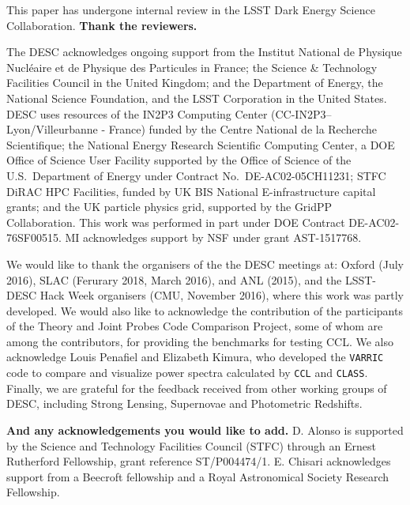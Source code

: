 %
This paper has undergone internal review in the LSST Dark Energy Science Collaboration. {\bf Thank the reviewers.}

The DESC acknowledges ongoing support from the Institut National de Physique Nucl\'eaire et de Physique des Particules in France; the Science \& Technology Facilities Council in the United Kingdom; and the Department of Energy, the National Science Foundation, and the LSST Corporation in the United States.  DESC uses resources of the IN2P3 Computing Center (CC-IN2P3--Lyon/Villeurbanne - France) funded by the Centre National de la Recherche Scientifique; the National Energy Research Scientific Computing Center, a DOE Office of Science User Facility supported by the Office of Science of the U.S.\ Department of Energy under Contract No.\ DE-AC02-05CH11231; STFC DiRAC HPC Facilities, funded by UK BIS National E-infrastructure capital grants; and the UK particle physics grid, supported by the GridPP Collaboration.  This work was performed in part under DOE Contract DE-AC02-76SF00515. MI acknowledges support by NSF under grant AST-1517768.

We would like to thank the organisers of the the DESC meetings at: Oxford (July 2016), SLAC (Ferurary 2018, March 2016), and ANL (2015), and the LSST-DESC Hack Week organisers (CMU, November 2016), where this work 
was partly developed. We would also like to acknowledge the contribution of the participants of the Theory and Joint Probes Code Comparison Project, some of whom are among the \ccl contributors, for providing the benchmarks for testing CCL. We also acknowledge Louis Penafiel and Elizabeth Kimura, who developed the {\tt VARRIC} code to compare and visualize power spectra calculated by {\tt CCL} and {\tt CLASS}. Finally, we are grateful for the feedback received from other working groups of DESC, including Strong Lensing, Supernovae and Photometric Redshifts.

%
{\bf And any acknowledgements you would like to add.}
D. Alonso is supported by the Science and Technology Facilities Council (STFC) through an Ernest Rutherford Fellowship, grant reference ST/P004474/1.
E. Chisari acknowledges support from a Beecroft fellowship and a Royal Astronomical Society Research Fellowship. 
